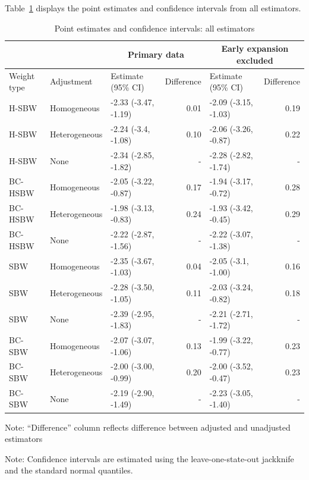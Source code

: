 Table~\ref{tab:confintmain} displays the point estimates and confidence intervals from all estimators. 

\begin{table}[h!]
\centering
\begin{threeparttable}
\caption{Point estimates and confidence intervals: all estimators}
\label{tab:confintmain}
\begin{tabular}{lllrlr}
\hline
 &  & \multicolumn{2}{c}{Primary data} & \multicolumn{2}{c}{Early expansion 
 excluded} \\
  \hline
Weight type & Adjustment & Estimate (95\% CI) & Difference & Estimate (95\% CI) & Difference \\ 
  \hline
H-SBW & Homogeneous & -2.33 (-3.47, -1.19) & 0.01 & -2.09 (-3.15, -1.03) & 0.19 \\ 
  H-SBW & Heterogeneous & -2.24 (-3.4, -1.08) & 0.10 & -2.06 (-3.26, -0.87) & 0.22 \\ 
  H-SBW & None & -2.34 (-2.85, -1.82) & - & -2.28 (-2.82, -1.74) & - \\ 
  BC-HSBW & Homogeneous & -2.05 (-3.22, -0.87) & 0.17 & -1.94 (-3.17, -0.72) & 0.28 \\ 
  BC-HSBW & Heterogeneous & -1.98 (-3.13, -0.83) & 0.24 & -1.93 (-3.42, -0.45) & 0.29 \\ 
  BC-HSBW & None & -2.22 (-2.87, -1.56) & - & -2.22 (-3.07, -1.38) & - \\ 
  SBW & Homogeneous & -2.35 (-3.67, -1.03) & 0.04 & -2.05 (-3.1, -1.00) & 0.16 \\ 
  SBW & Heterogeneous & -2.28 (-3.50, -1.05) & 0.11 & -2.03 (-3.24, -0.82) & 0.18 \\ 
  SBW & None & -2.39 (-2.95, -1.83) & - & -2.21 (-2.71, -1.72) & - \\ 
  BC-SBW & Homogeneous & -2.07 (-3.07, -1.06) & 0.13 & -1.99 (-3.22, -0.77) & 0.23 \\ 
  BC-SBW & Heterogeneous & -2.00 (-3.00, -0.99) & 0.20 & -2.00 (-3.52, -0.47) & 0.23 \\ 
  BC-SBW & None & -2.19 (-2.90, -1.49) & - & -2.23 (-3.05, -1.40) & - \\ 
   \hline
\end{tabular}
    \begin{tablenotes}
      \item[] Note: ``Difference'' column reflects difference between adjusted and unadjusted estimators
        \item[] Note: Confidence intervals are estimated using the leave-one-state-out jackknife and the standard normal quantiles.
    \end{tablenotes}
\end{threeparttable}
\end{table}

